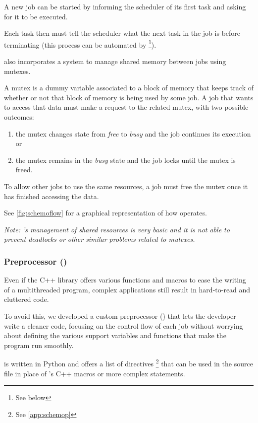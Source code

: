   A new job can be started by informing the scheduler of its first
  task and asking for it to be executed.

  Each task then must tell the scheduler what the next task in the
  job is before terminating (this process can be automated by
  \footnote{See below}).

  \ScheMo{} also incorporates a system to manage shared memory between
  jobs using mutexes.

  \beforelist* A mutex is a dummy variable associated to a block of memory that
  keeps track of whether or not that block of memory is being used by
  some job. A job that wants to access that data must make a request
  to the related mutex, with two possible outcomes:
  \begin{enumerate}
    \item the mutex changes state from \textit{free} to
      \textit{busy} and the job continues its execution or
    \item the mutex remains in the \textit{busy} state and the job
      locks until the mutex is freed.
  \end{enumerate}
  \afterlist*
  To allow other jobs to use the same resources, a job must free the
  mutex once it has finished accessing the data.

  See \autoref{fig:schemoflow} for a graphical representation
  of how \ScheMo{} operates.

  \textit{Note: \ScheMo{}'s management of shared resources is very
  basic and it is not able to prevent deadlocks or other similar
  problems related to mutexes.}
 
\subsubsection{\ScheMo{} Preprocessor ()}
  Even if the C++ library offers various functions and macros to
  ease the writing of a multithreaded program, complex applications
  still result in hard-to-read and cluttered code.

  To avoid this, we developed a custom preprocessor
  () that lets the developer write a cleaner code,
  focusing on the control flow of each job without worrying about
  defining the various support variables and functions that make the
  program run smoothly.

   is written in Python and offers a list of directives%
  \footnote{See \autoref{app:schemop}} that can be used in the
  source file in place of \ScheMo{}'s C++ macros or more complex statements.
  
